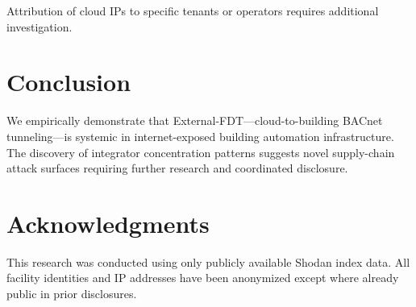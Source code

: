 \documentclass[11pt,a4paper]{article}
\begin{document}
Attribution of cloud IPs to specific tenants or operators requires 
additional investigation.

\section{Conclusion}

We empirically demonstrate that External-FDT---cloud-to-building BACnet 
tunneling---is systemic in internet-exposed building automation infrastructure. 
The discovery of integrator concentration patterns suggests novel supply-chain 
attack surfaces requiring further research and coordinated disclosure.

\section*{Acknowledgments}

This research was conducted using only publicly available Shodan index data.
All facility identities and IP addresses have been anonymized except where 
already public in prior disclosures.


\end{document}
